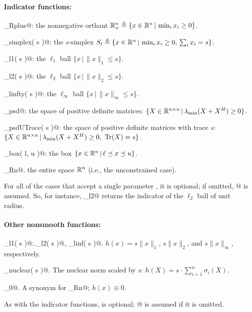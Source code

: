 \documentclass{article}
\begin{document}
\paragraph{Indicator functions:}
\begin{trivlist}
\item \verb@proj_Rplus@: the nonnegative orthant $\mathbb{R}^n_+\triangleq\{x\in\mathbb{R}^n\,|\,\min_i x_i\geq 0\}$.
\item \verb@proj_simplex( s )@: the $s$-simplex $S_t\triangleq\{x\in\mathbb{R}^n\,|\,\min_i x_i\geq 0,\,\sum_i x_i=s\}$.
\item \verb@proj_l1( s )@: the $\ell_1$ ball $\{x\,|\,\|x\|_1\leq s \}$.
\item \verb@proj_l2( s )@: the $\ell_2$ ball $\{x\,|\,\|x\|_2\leq s \}$.
\item \verb@proj_linfty( s )@: the $\ell_\infty$ ball $\{x\,|\,\|x\|_\infty\leq s \}$.
\item \verb@proj_psd@: the space of positive definite matrices: $\{X\in\mathbb{R}^{n\times n}\,|\,\lambda_{\min}(X+X^H)\geq 0\}$.
\item \verb@proj_psdUTrace( s )@: the space of positive definite matrices with trace $s$: $\{X\in\mathbb{R}^{n\times n}\,|\,\lambda_{\min}(X+X^H)\geq 0,~\mathop{\textrm{Tr}}(X)=s\}$.
\item \verb@proj_box( l, u )@: the box $\{x\in\mathbb{R}^n\,|\,\ell\preceq x \preceq u\}$.
\item \verb@proj_Rn@. the entire space $\mathbb{R}^n$ (i.e., the unconstrained case).
\end{trivlist}
For all of the cases that accept a single parameter \verb@s@, it is
optional; if omitted, @ is assumed. So, for instance,
\verb@proj_l2@ returns the indicator of the $\ell_2$ ball of unit
radius.

\paragraph{Other nonsmooth functions:}
\begin{trivlist}
\item \verb@prox_l1( s )@:.\verb@prox_l2( s )@, \verb@prox_linf( s )@. $h(x)=s\|x\|_1$, $s\|x\|_2$, and $s\|x\|_\infty$, respectively.
\item \verb@prox_nuclear( s )@. The nuclear norm scaled by $s$: $h(X) = s\cdot \sum_{i=1}^n \sigma_i(X)$. 
\item \verb@prox_0@. A synonym for \verb@proj_Rn@; $h(x)\equiv 0$.
\end{trivlist}
As with the indicator functions, \verb@s@ is optional; @ is assumed if it is omitted.
\end{document}
